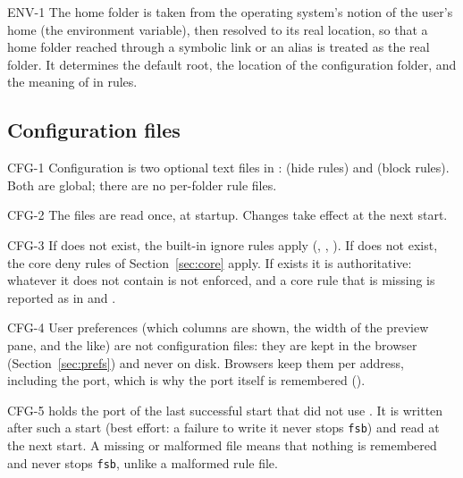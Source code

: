 \begin{req}{ENV-1}
The home folder is taken from the operating system's notion of the user's home
(the  environment variable), then resolved to its real location, so that
a home folder reached through a symbolic link or an alias is treated as the real
folder.  It determines the default root, the location of the configuration folder,
and the meaning of \code{\~{}} in rules.
\end{req}

\subsection{Configuration files}
\label{sec:config}

\begin{req}{CFG-1}
Configuration is two optional text files in : 
(hide rules) and  (block rules).  Both are global; there are no
per-folder rule files.
\end{req}

\begin{req}{CFG-2}
The files are read once, at startup.  Changes take effect at the next start.
\end{req}

\begin{req}{CFG-3}
If  does not exist, the built-in ignore rules apply (,
, ).  If  does not exist, the core deny
rules of Section~\ref{sec:core} apply.  If  exists it is authoritative:
whatever it does not contain is not enforced, and a core rule that is missing is
reported as in  and .
\end{req}

\begin{req}{CFG-4}
User preferences (which columns are shown, the width of the preview pane, and the
like) are not configuration files: they are kept in the browser
(Section~\ref{sec:prefs}) and never on disk.  Browsers keep them per address,
including the port, which is why the port itself is remembered ().
\end{req}

\begin{req}{CFG-5}
 holds the port of the last successful start that
did not use .  It is written after such a start (best effort: a failure
to write it never stops \texttt{fsb}) and read at the next start.  A missing or
malformed file means that nothing is remembered and never stops \texttt{fsb}, unlike
a malformed rule file.
\end{req}

